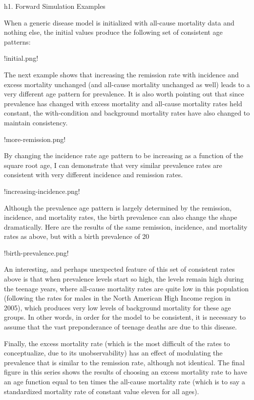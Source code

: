 h1. Forward Simulation Examples

When a generic disease model is initialized with all-cause mortality data and nothing else, the initial values produce the following set of consistent age patterns:

!initial.png!

The next example shows that increasing the remission rate with incidence and excess mortality unchanged (and all-cause mortality unchanged as well) leads to a very different age pattern for prevalence. It is also worth pointing out that since prevalence has changed with excess mortality and all-cause mortality rates held constant, the with-condition and background mortality rates have also changed to maintain consistency.

!more-remission.png!

By changing the incidence rate age pattern to be increasing as a function of the square root age, I can demonstrate that very similar prevalence rates are consistent with very different incidence and remission rates.

!increasing-incidence.png!

Although the prevalence age pattern is largely determined by the remission, incidence, and mortality rates, the birth prevalence can also change the shape dramatically.  Here are the results of the same remission, incidence, and mortality rates as above, but with a birth prevalence of 20%

!birth-prevalence.png!

An interesting, and perhaps unexpected feature of this set of consistent rates above is that when prevalence levels start so high, the levels remain high during the teenage years, where all-cause mortality rates are quite low in this population (following the rates for males in the North American High Income region in 2005), which produces very low levels of background mortality for these age groups. In other words, in order for the model to be consistent, it is necessary to assume that the vast preponderance of teenage deaths are due to this disease.

Finally, the excess mortality rate (which is the most difficult of the rates to conceptualize, due to its unobservability) has an effect of modulating the prevalence that is similar to the remission rate, although not identical.  The final figure in this series shows the results of choosing an excess mortality rate to have an age function equal to ten times the all-cause mortality rate (which is to say a standardized mortality rate of constant value eleven for all ages).

